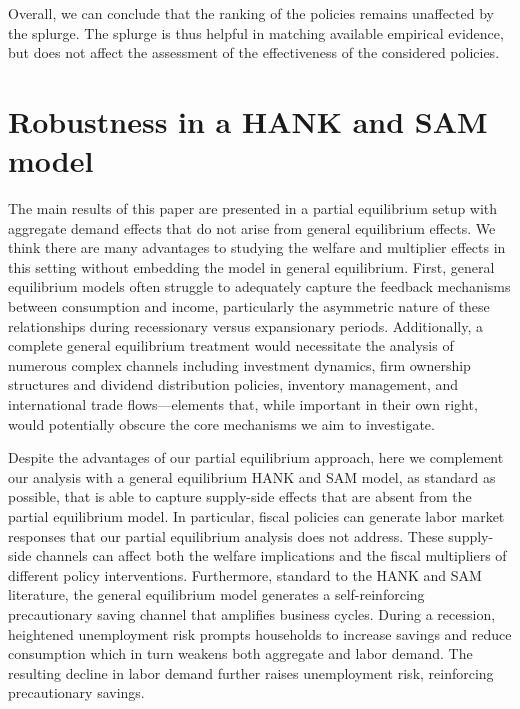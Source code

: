 \documentclass[qe,draft]{econsocart}
\theoremstyle{plain}
\theoremstyle{definition}
\begin{document}
\vspace{0.5em}

Overall, we can conclude that the ranking of the policies remains unaffected by the splurge.
The splurge is thus helpful in matching available empirical evidence, but does not affect the assessment of the effectiveness of the considered policies.


\FloatBarrier
\section{Robustness in a HANK and SAM model}
\label{sec:hank} %

The main results of this paper are presented in a partial equilibrium setup with aggregate demand effects that do not arise from general equilibrium effects. We think there are many advantages to studying the welfare and multiplier effects in this setting without embedding the model in general equilibrium.  First, general equilibrium models often struggle to adequately capture the feedback mechanisms between consumption and income, particularly the asymmetric nature of these relationships during recessionary versus expansionary periods. Additionally, a complete general equilibrium treatment would necessitate the analysis of numerous complex channels including investment dynamics, firm ownership structures and dividend distribution policies, inventory management, and international trade flows—elements that, while important in their own right, would potentially obscure the core mechanisms we aim to investigate.

Despite the advantages of our partial equilibrium approach, here we complement our analysis with a general equilibrium HANK and SAM model, as standard as possible, that is able to capture supply-side effects that are absent from the partial equilibrium model. In particular, fiscal policies can generate labor market responses that our partial equilibrium analysis does not address. These supply-side channels can affect both the welfare implications and the fiscal multipliers of different policy interventions. Furthermore, standard to the HANK and SAM literature, the general equilibrium model generates a self-reinforcing precautionary saving channel that amplifies business cycles. During a recession, heightened unemployment risk prompts households to increase savings and reduce consumption which in turn weakens both aggregate and labor demand. The resulting decline in labor demand further raises unemployment risk, reinforcing precautionary savings.
\end{document}

